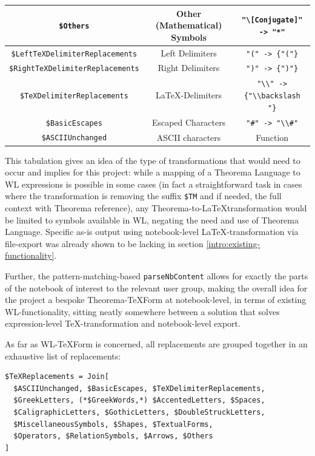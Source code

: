 \begin{center}
\begin{tabular}{||c c c||}
         \hline
         \lstinline+$Others+ & Other (Mathematical) Symbols & \lstinline+"\[Conjugate]" -> "*"+ \\
         \hline
         \lstinline+$LeftTeXDelimiterReplacements+ & Left Delimiters & \lstinline+"(" -> {"("}+ \\
         \hline
         \lstinline+$RightTeXDelimiterReplacements+ & Right Delimiters & \lstinline+")" -> {")"}+ \\
         \hline
         \lstinline+$TeXDelimiterReplacements+ & \LaTeX-Delimiters & \lstinline+"\\" -> {"\\backslash "}+ \\
         \hline
         \lstinline+$BasicEscapes+ & Escaped Characters & \lstinline+"#" -> "\\#"+ \\
         \hline
         \lstinline+$ASCIIUnchanged+ & ASCII characters & Function \\
         \hline
    \end{tabular}
\end{center}

This tabulation gives an idea of the type of transformations that would need to occur and implies for this project: while a mapping of a Theorema Language to WL expressions is possible in some cases (in fact a straightforward task in cases where the transformation is removing the suffix \lstinline+$TM+ and if needed, the full context with Theorema reference), any Theorema-to-\LaTeX transformation would be limited to symbols available in WL, negating the need and use of Theorema Language. Specific as-is output using notebook-level \LaTeX-transformation via file-export was already shown to be lacking in section \ref{intro:existing-functionality}.

Further, the pattern-matching-based \lstinline+parseNbContent+ allows for exactly the parts of the notebook of interest to the relevant user group, making the overall idea for the project a bespoke Theorema-TeXForm at notebook-level, in terms of existing WL-functionality, sitting neatly somewhere between a solution that solves expression-level TeX-transformation and notebook-level export.

As far as WL-TeXForm is concerned, all replacements are grouped together in an exhaustive list of replacements:

\begin{verbatim}
$TeXReplacements = Join[
  $ASCIIUnchanged, $BasicEscapes, $TeXDelimiterReplacements,
  $GreekLetters, (*$GreekWords,*) $AccentedLetters, $Spaces,
  $CaligraphicLetters, $GothicLetters, $DoubleStruckLetters,
  $MiscellaneousSymbols, $Shapes, $TextualForms,
  $Operators, $RelationSymbols, $Arrows, $Others
]
\end{verbatim}

